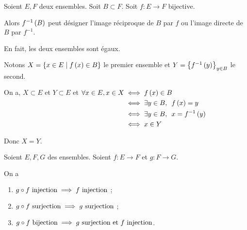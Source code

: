 \begin{rem}
Soient \(E,F\) deux ensembles. Soit \(B\subset F\). Soit \(f:E\to F\) bijective.

Alors \(f^{-1}\left(B\right)\) peut désigner l'image réciproque de \(B\) par \(f\) ou l'image directe de \(B\) par \(f^{-1}\).

En fait, les deux ensembles sont égaux.
\end{rem}

\begin{dem}
Notons \(X=\left\lbrace x\in E\;\middle|\; f\left(x\right)\in B\right\rbrace\) le premier ensemble et \(Y=\left\lbrace f^{-1}\left(y\right)\right\rbrace_{y\in B}\) le second.

On a, \(X\subset E\) et \(Y\subset E\) et \(\begin{aligned}[t]
\forall x\in E,x\in X&\iff f\paren{x}\in B \\
&\iff\quantifs{\exists y\in B}f\paren{x}=y \\
&\iff\quantifs{\exists y\in B}x=f^{-1}\paren{y} \\
&\iff x\in Y
\end{aligned}\)

Donc \(X=Y\).
\end{dem}

\begin{prop}
Soient \(E,F,G\) des ensembles. Soient \(f:E\to F\) et \(g:F\to G\).

On a \begin{enumerate}
\item \(g\circ f\text{ injection}\implies f\text{ injection}\) ;

\item \(g\circ f\text{ surjection}\implies g\text{ surjection}\) ;

\item \(g\circ f\text{ bijection}\implies g\text{ surjection et }f\text{ injection}\).
\end{enumerate}
\end{prop}

